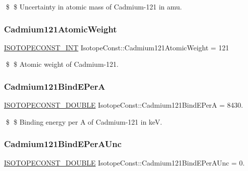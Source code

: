 \$ \$ Uncertainty in atomic mass of Cadmium-\/121 in amu. \mbox{\label{group___isotope_const-_cadmium-_cd121_ga21672d962638a070077d71566cc763d9}} 
\subsubsection{\texorpdfstring{Cadmium121\+Atomic\+Weight}{Cadmium121AtomicWeight}}
{\footnotesize\ttfamily \mbox{\hyperlink{group___isotope_const-_macros_ga5f18360b3e99483a35c32d789e62621c}{I\+S\+O\+T\+O\+P\+E\+C\+O\+N\+S\+T\+\_\+\+I\+NT}} Isotope\+Const\+::\+Cadmium121\+Atomic\+Weight = 121}

\$ \$ Atomic weight of Cadmium-\/121. \mbox{\label{group___isotope_const-_cadmium-_cd121_ga05e196146d57b06e619aa36b134a18fb}} 
\subsubsection{\texorpdfstring{Cadmium121\+Bind\+E\+PerA}{Cadmium121BindEPerA}}
{\footnotesize\ttfamily \mbox{\hyperlink{group___isotope_const-_macros_ga8f45a7272ce02c0b4c65c44636ed719a}{I\+S\+O\+T\+O\+P\+E\+C\+O\+N\+S\+T\+\_\+\+D\+O\+U\+B\+LE}} Isotope\+Const\+::\+Cadmium121\+Bind\+E\+PerA = 8430.}

\$ \$ Binding energy per A of Cadmium-\/121 in keV. \mbox{\label{group___isotope_const-_cadmium-_cd121_ga28714434afe8351291b81dc1875be45e}} 
\subsubsection{\texorpdfstring{Cadmium121\+Bind\+E\+Per\+A\+Unc}{Cadmium121BindEPerAUnc}}
{\footnotesize\ttfamily \mbox{\hyperlink{group___isotope_const-_macros_ga8f45a7272ce02c0b4c65c44636ed719a}{I\+S\+O\+T\+O\+P\+E\+C\+O\+N\+S\+T\+\_\+\+D\+O\+U\+B\+LE}} Isotope\+Const\+::\+Cadmium121\+Bind\+E\+Per\+A\+Unc = 0.}

